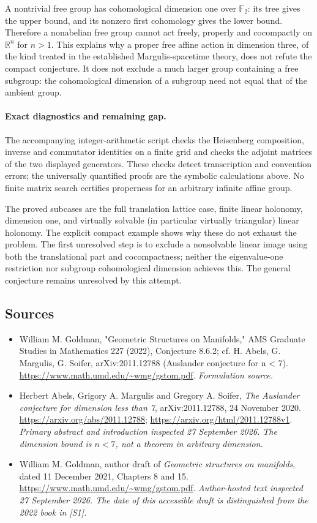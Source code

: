 \documentclass[11pt]{article}
\begin{document}
A nontrivial free group has cohomological dimension one over
$\mathbb F_2$: its tree gives the upper bound, and its nonzero first
cohomology gives the lower bound. Therefore a nonabelian free group
cannot act freely, properly and cocompactly on $\mathbb R^n$ for $n>1$.
This explains why a proper free affine action in dimension three,
of the kind treated in the established Margulis-spacetime theory,
does not refute the compact conjecture. It does not exclude a much
larger group containing a free subgroup: the cohomological dimension
of a subgroup need not equal that of the ambient group.

\paragraph{Exact diagnostics and remaining gap.}
The accompanying integer-arithmetic script checks the Heisenberg
composition, inverse and commutator identities on a finite grid and
checks the adjoint matrices of the two displayed generators. These
checks detect transcription and convention errors; the universally
quantified proofs are the symbolic calculations above. No finite
matrix search certifies properness for an arbitrary infinite affine group.

The proved subcases are the full translation lattice case, finite
linear holonomy, dimension one, and virtually solvable (in particular
virtually triangular) linear holonomy. The explicit compact example
shows why these do not exhaust the problem. The first unresolved step
is to exclude a nonsolvable linear image using both the translational
part and cocompactness; neither the eigenvalue-one restriction nor
subgroup cohomological dimension achieves this. The general conjecture
remains unresolved by this attempt.
\subsection{Sources}
\begin{itemize}
\item[S1]William M. Goldman, "Geometric Structures on Manifolds," AMS Graduate Studies in Mathematics 227 (2022), Conjecture 8.6.2; cf. H. Abels, G. Margulis, G. Soifer, arXiv:2011.12788 (Auslander conjecture for n < 7).
\url{https://www.math.umd.edu/~wmg/gstom.pdf}.
\textit{Formulation source.}
\item[E1]Herbert Abels, Grigory A. Margulis and Gregory A. Soifer,
\emph{The Auslander conjecture for dimension less than 7},
arXiv:2011.12788, 24 November 2020.
\url{https://arxiv.org/abs/2011.12788};
\url{https://arxiv.org/html/2011.12788v1}.
\textit{Primary abstract and introduction inspected 27 September 2026.
The dimension bound is $n<7$, not a theorem in arbitrary dimension.}
\item[E2]William M. Goldman, author draft of \emph{Geometric structures
on manifolds}, dated 11 December 2021, Chapters 8 and 15.
\url{https://www.math.umd.edu/~wmg/gstom.pdf}.
\textit{Author-hosted text inspected 27 September 2026. The date of
this accessible draft is distinguished from the 2022 book in [S1].}
\end{itemize}
\end{document}
